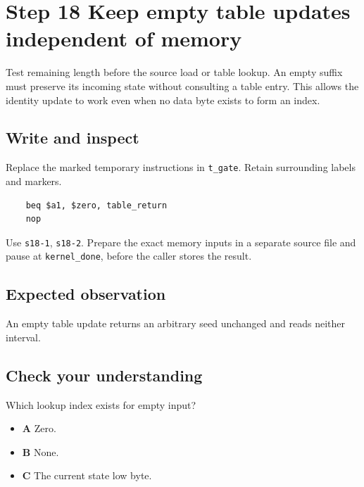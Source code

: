 \section{Step 18 Keep empty table updates independent of memory}\label{crc-s18}

Test remaining length before the source load or table lookup. An empty suffix must preserve its incoming state without consulting a table entry. This allows the identity update to work even when no data byte exists to form an index.

\subsection{Write and inspect}
Replace the marked temporary instructions in \texttt{t\_gate}. Retain surrounding labels and markers.

\begin{verbatim}
    beq $a1, $zero, table_return
    nop
\end{verbatim}

Use \texttt{s18-1}, \texttt{s18-2}. Prepare the exact memory inputs in a separate source file and pause at \texttt{kernel\_done}, before the caller stores the result.

\subsection{Expected observation}
An empty table update returns an arbitrary seed unchanged and reads neither interval.

\subsection{Check your understanding}
Which lookup index exists for empty input?

\begin{itemize}
  \item \textbf{A} Zero.
  \item \textbf{B} None.
  \item \textbf{C} The current state low byte.
\end{itemize}
